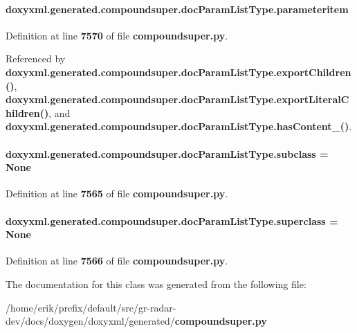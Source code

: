 \paragraph[{parameteritem}]{\setlength{\rightskip}{0pt plus 5cm}doxyxml.\+generated.\+compoundsuper.\+doc\+Param\+List\+Type.\+parameteritem}\label{classdoxyxml_1_1generated_1_1compoundsuper_1_1docParamListType_a464dc8fb97cfe44a426feda45004717c}


Definition at line {\bf 7570} of file {\bf compoundsuper.\+py}.



Referenced by {\bf doxyxml.\+generated.\+compoundsuper.\+doc\+Param\+List\+Type.\+export\+Children()}, {\bf doxyxml.\+generated.\+compoundsuper.\+doc\+Param\+List\+Type.\+export\+Literal\+Children()}, and {\bf doxyxml.\+generated.\+compoundsuper.\+doc\+Param\+List\+Type.\+has\+Content\+\_\+()}.

\paragraph[{subclass}]{\setlength{\rightskip}{0pt plus 5cm}doxyxml.\+generated.\+compoundsuper.\+doc\+Param\+List\+Type.\+subclass = None\hspace{0.3cm}{\ttfamily [static]}}\label{classdoxyxml_1_1generated_1_1compoundsuper_1_1docParamListType_aeca29ff9cb3f51d8a684678e21848f55}


Definition at line {\bf 7565} of file {\bf compoundsuper.\+py}.

\paragraph[{superclass}]{\setlength{\rightskip}{0pt plus 5cm}doxyxml.\+generated.\+compoundsuper.\+doc\+Param\+List\+Type.\+superclass = None\hspace{0.3cm}{\ttfamily [static]}}\label{classdoxyxml_1_1generated_1_1compoundsuper_1_1docParamListType_af697bc9bb7c6ede0886943525b494312}


Definition at line {\bf 7566} of file {\bf compoundsuper.\+py}.



The documentation for this class was generated from the following file\+:\begin{DoxyCompactItemize}
\item 
/home/erik/prefix/default/src/gr-\/radar-\/dev/docs/doxygen/doxyxml/generated/{\bf compoundsuper.\+py}\end{DoxyCompactItemize}
